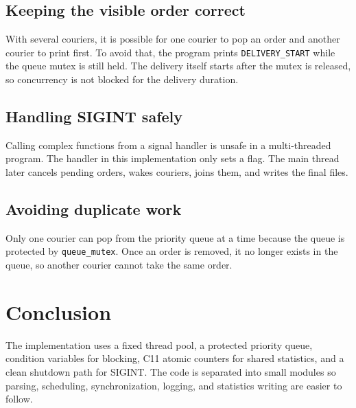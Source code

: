 \documentclass[11pt,a4paper]{article}
\begin{document}
\subsection{Keeping the visible order correct}

With several couriers, it is possible for one courier to pop an order and another courier to print first. To avoid that, the program prints \texttt{DELIVERY\_START} while the queue mutex is still held. The delivery itself starts after the mutex is released, so concurrency is not blocked for the delivery duration.

\subsection{Handling SIGINT safely}

Calling complex functions from a signal handler is unsafe in a multi-threaded program. The handler in this implementation only sets a flag. The main thread later cancels pending orders, wakes couriers, joins them, and writes the final files.

\subsection{Avoiding duplicate work}

Only one courier can pop from the priority queue at a time because the queue is protected by \texttt{queue\_mutex}. Once an order is removed, it no longer exists in the queue, so another courier cannot take the same order.

\section{Conclusion}

The implementation uses a fixed thread pool, a protected priority queue, condition variables for blocking, C11 atomic counters for shared statistics, and a clean shutdown path for SIGINT. The code is separated into small modules so parsing, scheduling, synchronization, logging, and statistics writing are easier to follow.
\end{document}

